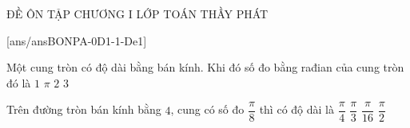 \setcounter{deso}{0}
\begin{name}
	{\tenchude}
	{ĐỀ ÔN TẬP CHƯƠNG I}
	{LỚP TOÁN THẦY PHÁT}
	{\thoigian}
\end{name}
\TN
{}[ans/ansBONPA-0D1-1-De1]
\begin{ex}%
	Một cung tròn có độ dài bằng bán kính. Khi đó số đo bằng rađian của cung tròn đó là
	\choice
	{\True $1$}
	{$\pi$}
	{$2$}
	{$3$}
\end{ex}

\begin{ex}%
	Trên đường tròn bán kính bằng $4$, cung có số đo $\dfrac{\pi}{8}$ thì có độ dài là
	\choice
	{\True $\dfrac{\pi}{4}$}
	{$\dfrac{\pi}{3}$}
	{$\dfrac{\pi}{16}$}
	{$\dfrac{\pi}{2}$}
\end{ex}

